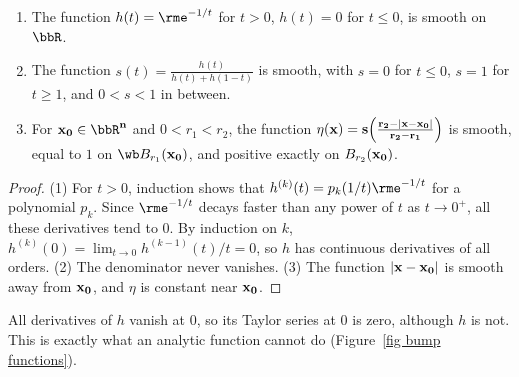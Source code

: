 \begin{lem}\label{lem smooth bumps}
    \begin{enumerate}
        \item The function $h(t)=\rme^{-1/t}$ for $t>0$, $h(t)=0$ for $t\leq0$, is smooth on $\bbR$.
        \item The function $s(t)=\frac{h(t)}{h(t)+h(1-t)}$ is smooth, with $s=0$ for $t\leq0$, $s=1$ for $t\geq1$, and $0<s<1$ in between.
        \item For $\bf{x}_0\in\bbR^n$ and $0<r_1<r_2$, the function $\eta(\bf{x})=s\Big(\frac{r_2-\lvert\bf{x}-\bf{x}_0\rvert}{r_2-r_1}\Big)$ is smooth, equal to $1$ on $\wb B_{r_1}(\bf{x}_0)$, and positive exactly on $B_{r_2}(\bf{x}_0)$.
    \end{enumerate}
\end{lem}
\begin{proof}
    (1) For $t>0$, induction shows that $h^{(k)}(t)=p_k(1/t)\rme^{-1/t}$ for a polynomial $p_k$. Since $\rme^{-1/t}$ decays faster than any power of $t$ as $t\to0^+$, all these derivatives tend to $0$. By induction on $k$, $h^{(k)}(0)=\lim_{t\to0}h^{(k-1)}(t)/t=0$, so $h$ has continuous derivatives of all orders. (2) The denominator never vanishes. (3) The function $\lvert\bf{x}-\bf{x}_0\rvert$ is smooth away from $\bf{x}_0$, and $\eta$ is constant near $\bf{x}_0$.
\end{proof}
All derivatives of $h$ vanish at $0$, so its Taylor series at $0$ is zero, although $h$ is not. This is exactly what an analytic function cannot do (Figure~\ref{fig bump functions}).

